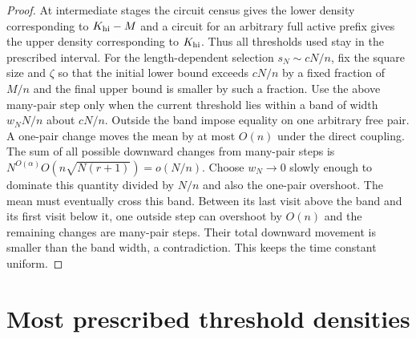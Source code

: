 \documentclass[11pt]{article}
\begin{document}
\begin{proof}
At intermediate stages the circuit census gives the lower density corresponding to $K_{\rm hi}-M$ and a circuit for an arbitrary full active prefix gives the upper density corresponding to $K_{\rm hi}$. Thus all thresholds used stay in the prescribed interval. For the length-dependent selection $s_N\sim cN/n$, fix the square size and $\zeta$ so that the initial lower bound exceeds $cN/n$ by a fixed fraction of $M/n$ and the final upper bound is smaller by such a fraction. Use the above many-pair step only when the current threshold lies within a band of width $w_NN/n$ about $cN/n$. Outside the band impose equality on one arbitrary free pair. A one-pair change moves the mean by at most $O(n)$ under the direct coupling. The sum of all possible downward changes from many-pair steps is $N^{O(\alpha)}O(n\sqrt{N(r+1)})=o(N/n)$. Choose $w_N\to0$ slowly enough to dominate this quantity divided by $N/n$ and also the one-pair overshoot. The mean must eventually cross this band. Between its last visit above the band and its first visit below it, one outside step can overshoot by $O(n)$ and the remaining changes are many-pair steps. Their total downward movement is smaller than the band width, a contradiction. This keeps the time constant uniform.
\end{proof}

\section{Most prescribed threshold densities}
\end{document}
